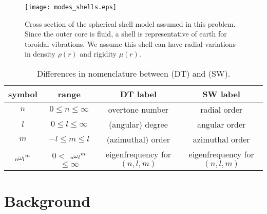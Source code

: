 \documentclass[11pt,titlepage,fleqn]{article}
\begin{document}

\begin{figure}[h]
\centering
\texttt{[image: modes\_shells.eps]}
\caption[]
{{
Cross section of the spherical shell model assumed in this problem. Since the outer core is fluid, a shell is representative of earth for toroidal vibrations. We assume this shell can have radial variations in density $\rho(r)$ and rigidity $\mu(r)$.
\label{fig:shells}
}}
\end{figure}



\begin{table}[h]
\centering
\caption[]
{{
Differences in nomenclature between \citet{DT} (DT) and \citet{SteinWysession} (SW).
\label{tab:names}
}}
\tgap
\begin{tabular}{||c|c|c|c||}
\hline
symbol & range & DT label & SW label \\ \hline\hline
$n$ & $0 \le n \le \infty$ & overtone number & radial order \\ \hline
$l$ & $0 \le l \le \infty$ & (angular) degree & angular order \\ \hline
$m$ & $-l \le m \le l$ & (azimuthal) order & azimuthal order \\ \hline
$\mbox{${}_{n\hspace{-0.2 mm}}\omega_l$}^m$ & $0 < $ $\mbox{${}_{n\hspace{-0.2 mm}}\omega_l$}^m$ $ \le \infty$ & eigenfrequency for $(n,l,m)$ & eigenfrequency for $(n,l,m)$ \\ \hline
\end{tabular}
\end{table}



\clearpage\pagebreak



\clearpage\pagebreak
\section{Background}
\end{document}
